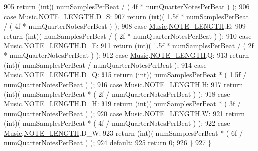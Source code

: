 \begin{DoxyCode}
905                 \textcolor{keywordflow}{return} (\textcolor{keywordtype}{int})( numSamplesPerBeat / ( 4f * numQuarterNotesPerBeat ) );
906             \textcolor{keywordflow}{case} \hyperlink{class_music}{Music}.\hyperlink{group___music_enums_gaf11b5f079adbb21c800b9eca1c5c3cbd}{NOTE\_LENGTH}.D\_S:
907                 \textcolor{keywordflow}{return} (\textcolor{keywordtype}{int})( 1.5f * numSamplesPerBeat / ( 4f * numQuarterNotesPerBeat ) );
908             \textcolor{keywordflow}{case} \hyperlink{class_music}{Music}.\hyperlink{group___music_enums_gaf11b5f079adbb21c800b9eca1c5c3cbd}{NOTE\_LENGTH}.E:
909                 \textcolor{keywordflow}{return} (\textcolor{keywordtype}{int})( numSamplesPerBeat / ( 2f * numQuarterNotesPerBeat ) );
910             \textcolor{keywordflow}{case} \hyperlink{class_music}{Music}.\hyperlink{group___music_enums_gaf11b5f079adbb21c800b9eca1c5c3cbd}{NOTE\_LENGTH}.D\_E:
911                 \textcolor{keywordflow}{return} (\textcolor{keywordtype}{int})( 1.5f * numSamplesPerBeat / ( 2f * numQuarterNotesPerBeat ) );
912             \textcolor{keywordflow}{case} \hyperlink{class_music}{Music}.\hyperlink{group___music_enums_gaf11b5f079adbb21c800b9eca1c5c3cbd}{NOTE\_LENGTH}.Q:
913                 \textcolor{keywordflow}{return} (\textcolor{keywordtype}{int})( numSamplesPerBeat / numQuarterNotesPerBeat );
914             \textcolor{keywordflow}{case} \hyperlink{class_music}{Music}.\hyperlink{group___music_enums_gaf11b5f079adbb21c800b9eca1c5c3cbd}{NOTE\_LENGTH}.D\_Q:
915                 \textcolor{keywordflow}{return} (\textcolor{keywordtype}{int})( numSamplesPerBeat * ( 1.5f / numQuarterNotesPerBeat ) );
916             \textcolor{keywordflow}{case} \hyperlink{class_music}{Music}.\hyperlink{group___music_enums_gaf11b5f079adbb21c800b9eca1c5c3cbd}{NOTE\_LENGTH}.H:
917                 \textcolor{keywordflow}{return} (\textcolor{keywordtype}{int})( numSamplesPerBeat * ( 2f / numQuarterNotesPerBeat ) );
918             \textcolor{keywordflow}{case} \hyperlink{class_music}{Music}.\hyperlink{group___music_enums_gaf11b5f079adbb21c800b9eca1c5c3cbd}{NOTE\_LENGTH}.D\_H:
919                 \textcolor{keywordflow}{return} (\textcolor{keywordtype}{int})( numSamplesPerBeat * ( 3f / numQuarterNotesPerBeat ) );
920             \textcolor{keywordflow}{case} \hyperlink{class_music}{Music}.\hyperlink{group___music_enums_gaf11b5f079adbb21c800b9eca1c5c3cbd}{NOTE\_LENGTH}.W:
921                 \textcolor{keywordflow}{return} (\textcolor{keywordtype}{int})( numSamplesPerBeat * ( 4f / numQuarterNotesPerBeat ) );
922             \textcolor{keywordflow}{case} \hyperlink{class_music}{Music}.\hyperlink{group___music_enums_gaf11b5f079adbb21c800b9eca1c5c3cbd}{NOTE\_LENGTH}.D\_W:
923                 \textcolor{keywordflow}{return} (\textcolor{keywordtype}{int})( numSamplesPerBeat * ( 6f / numQuarterNotesPerBeat ) );
924             \textcolor{keywordflow}{default}:
925                 \textcolor{keywordflow}{return} 0;
926         \}
927     \}
\end{DoxyCode}

